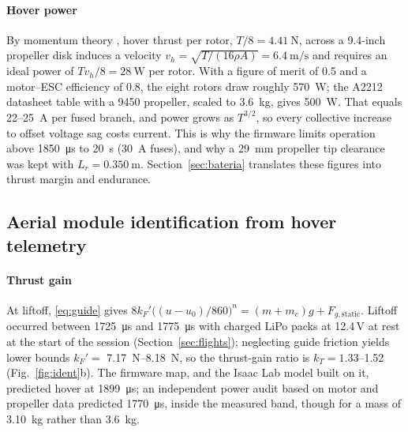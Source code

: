 \paragraph{Hover power}
By momentum theory \cite{leishman2006}, hover thrust per rotor, $T/8=\SI{4.41}{\newton}$, across a 9.4-inch propeller disk induces a velocity $v_h=\sqrt{T/(16\rho A)}=\SI{6.4}{\metre\per\second}$ and requires an ideal power of $Tv_h/8=\SI{28}{\watt}$ per rotor. With a figure of merit of 0.5 and a motor--ESC efficiency of 0.8, the eight rotors draw roughly \SI{570}{\watt}; the A2212 datasheet table with a 9450 propeller, scaled to \SI{3.6}{\kilo\gram}, gives \SI{500}{\watt}. That equals 22--\SI{25}{\ampere} per fused branch, and power grows as $T^{3/2}$, so every collective increase to offset voltage sag costs current. This is why the firmware limits operation above \SI{1850}{\micro\second} to \SI{20}{\second} (\SI{30}{\ampere} fuses), and why a \SI{29}{\milli\metre} propeller tip clearance was kept with $L_r=\SI{0.350}{\metre}$. Section~\ref{sec:bateria} translates these figures into thrust margin and endurance.

\subsection{Aerial module identification from hover telemetry}
\label{sec:ident}

\paragraph{Thrust gain}
At liftoff, \eqref{eq:guide} gives $8k_F'\big((u-u_0)/860\big)^n=(m+m_c)g+F_{g,\mathrm{static}}$. Liftoff occurred between \SI{1725}{\micro\second} and \SI{1775}{\micro\second} with charged LiPo packs at 12.4\,V at rest at the start of the session (Section~\ref{sec:flights}); neglecting guide friction yields lower bounds $k_F'=$ \SIrange{7.17}{8.18}{\newton}, so the thrust-gain ratio is $k_T=1.33$--1.52 (Fig.~\ref{fig:ident}b). The firmware map, and the Isaac Lab model built on it, predicted hover at \SI{1899}{\micro\second}; an independent power audit based on motor and propeller data predicted \SI{1770}{\micro\second}, inside the measured band, though for a mass of \SI{3.10}{\kilo\gram} rather than \SI{3.6}{\kilo\gram}.

